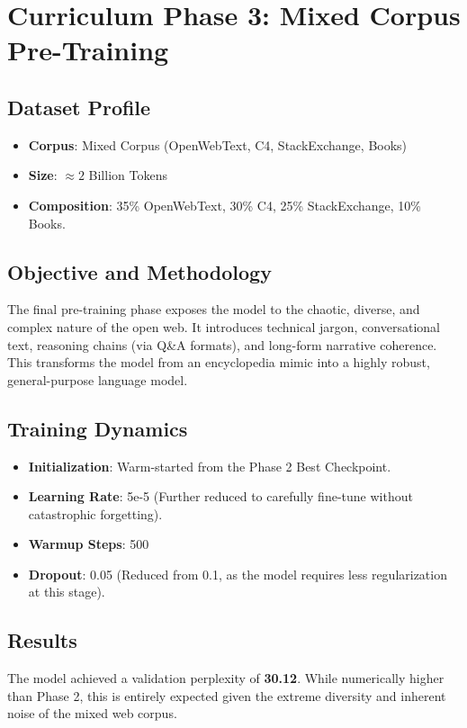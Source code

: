\documentclass[12pt]{article}
\begin{document}
\newpage

\section{Curriculum Phase 3: Mixed Corpus Pre-Training}
\subsection{Dataset Profile}
\begin{itemize}
    \item \textbf{Corpus}: Mixed Corpus (OpenWebText, C4, StackExchange, Books)
    \item \textbf{Size}: $\approx 2$ Billion Tokens
    \item \textbf{Composition}: 35\% OpenWebText, 30\% C4, 25\% StackExchange, 10\% Books.
\end{itemize}

\subsection{Objective and Methodology}
The final pre-training phase exposes the model to the chaotic, diverse, and complex nature of the open web. It introduces technical jargon, conversational text, reasoning chains (via Q\&A formats), and long-form narrative coherence. This transforms the model from an encyclopedia mimic into a highly robust, general-purpose language model.

\subsection{Training Dynamics}
\begin{itemize}
    \item \textbf{Initialization}: Warm-started from the Phase 2 Best Checkpoint.
    \item \textbf{Learning Rate}: 5e-5 (Further reduced to carefully fine-tune without catastrophic forgetting).
    \item \textbf{Warmup Steps}: 500
    \item \textbf{Dropout}: 0.05 (Reduced from 0.1, as the model requires less regularization at this stage).
\end{itemize}

\subsection{Results}
The model achieved a validation perplexity of \textbf{30.12}. While numerically higher than Phase 2, this is entirely expected given the extreme diversity and inherent noise of the mixed web corpus. 
\end{document}
